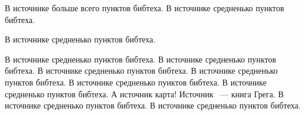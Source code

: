 В источнике \cite{rlove} больше всего пунктов бибтеха.
В источнике \cite{understanding} средненько пунктов бибтеха.

В источнике \cite{tanenbaum} средненько пунктов бибтеха.

В источнике \cite{johnson} средненько пунктов бибтеха.
В источнике \cite{kernelnewbies} средненько пунктов бибтеха.
В источнике \cite{vagin} средненько пунктов бибтеха.
В источнике \cite{lkml} средненько пунктов бибтеха.
В источнике \cite{anatomy} средненько пунктов бибтеха.
В источнике \cite{lwn} средненько пунктов бибтеха.
А источник \cite{map} карта!
Источник \cite{greg}~--- книга Грега.
В источнике \cite{profarch} средненько пунктов бибтеха.
В источнике \cite{man_syscall} средненько пунктов бибтеха.
